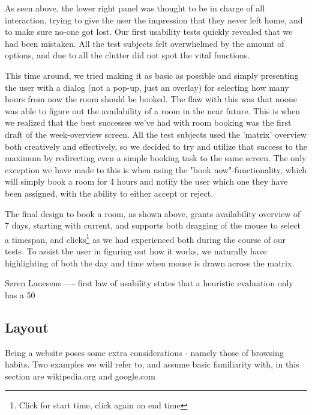 As seen above, the lower right panel was thought to be in charge of all interaction, trying to give the user the impression that they never left home, and to make sure no-one got lost. Our first usability tests quickly revealed that we had been mistaken. All the test subjects felt overwhelmed by the amount of options, and due to all the clutter did not spot the vital functions.


This time around, we tried making it as basic as possible and simply presenting the user with a dialog (not a pop-up, just an overlay) for selecting how many hours from now the room should be booked. The flaw with this was that noone was able to figure out the availability of a room in the near future. This is when we realized that the best successes we've had with room booking was the first draft of the week-overview screen.
All the test subjects used the 'matrix' overview both creatively and effectively, so we decided to try and utilize that success to the maximum by redirecting even a simple booking task to the same screen.
The only exception we have made to this is when using the "book now"-functionality, which will simply book a room for 4 hours and notify the user which one they have been assigned, with the ability to either accept or reject.


The final design to book a room, as shown above, grants availability overview of 7 days, starting with current, and supports both dragging of the mouse to select a timespan, and clicks\footnote{Click for start time, click again on end time} as we had experienced both during the course of our tests.
To assist the user in figuring out how it works, we naturally have highlighting of both the day and time when mouse is drawn across the matrix.

Søren Lauesens ---- first law of usability states that a heuristic evaluation only has a 50%


\subsection{Layout}
Being a website poses some extra considerations - namely those of browsing habits. Two examples we will refer to, and assume basic familiarity with, in this section are wikipedia.org and google.com

